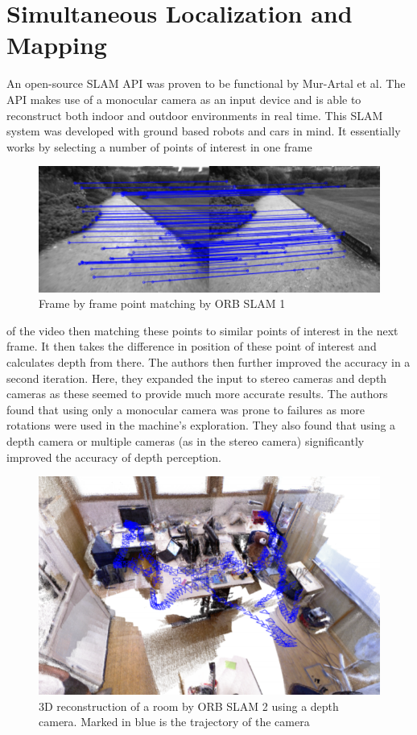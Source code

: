 \documentclass[english]{upeeei}
\begin{document}
\section{Simultaneous Localization and Mapping}
An open-source SLAM API was proven to be functional by Mur-Artal et al\cite{OrbSlam1}. The API makes use of a monocular camera as an
input device and is able to reconstruct both indoor and outdoor environments in real time. This SLAM system was developed
with ground based robots and cars in mind. It essentially works by selecting a number of points of interest in one frame
\begin{figure}[h]
    \centering
    \includegraphics[scale=0.5]{images/orbslam1_feat_tracking.PNG}
    \caption{Frame by frame point matching by ORB SLAM 1\cite{OrbSlam1}}
    \label{fig:orbslam1_tracking}
\end{figure}
of the video then matching these points to similar points of interest in the next frame. It then takes the difference in
position of these point of interest and calculates depth from there.
\newline
\newline 
The authors then further improved the accuracy in
a second iteration\cite{OrbSlam2}. Here, they expanded the input to stereo cameras and depth cameras as these seemed to provide much more
accurate results. The authors found that using only a monocular camera was prone to failures as more rotations were used
in the machine's exploration. They also found that using a depth camera or multiple cameras (as in the stereo camera) significantly
improved the accuracy of depth perception. 
\begin{figure}[h]
    \centering
    \includegraphics[scale=0.5]{images/orbslam2_recon.PNG}
    \caption{3D reconstruction of a room by ORB SLAM 2 using a depth camera. Marked in blue is the trajectory of the camera\cite{OrbSlam2}}
    \label{fig:orbslam2_recon}
\end{figure}
\end{document}
